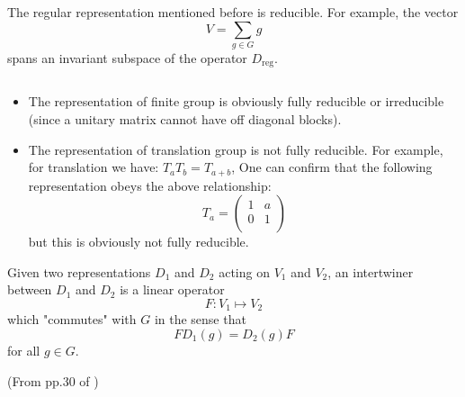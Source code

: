 \begin{ex}
    The regular representation mentioned before is reducible. For
    example, the vector
    \begin{equation}
        V = \sum_{g\in G} g
    \end{equation}
    spans an invariant subspace of the operator $D_\text{reg}$.
\end{ex}


\begin{ex}$ $

    \begin{itemize}
        \item The representation of finite group is obviously fully
            reducible or irreducible (since a unitary matrix cannot
            have off diagonal blocks).
        \item The representation of translation group is not fully
            reducible. For example, for translation we have:
            $T_a T_b = T_{a+b}$,
            One can confirm that the following representation obeys
            the above relationship:
            $$T_a = \left( \begin{array}{cc}
                 1 & a \\
                 0 & 1 \\
            \end{array} \right)$$
            but this is obviously not fully reducible.
    \end{itemize}
\end{ex}

\begin{defi}[Interwiner]
    Given two representations $D_1$ and $D_2$ acting on $V_1$ and
    $V_2$, an intertwiner between $D_1$ and $D_2$ is a linear operator
    \begin{equation}
        F: V_1 \mapsto V_2
    \end{equation}
    which "commutes" with $G$ in the sense that
    \begin{equation}
        F D_1(g) = D_2(g) F
    \end{equation}
    for all $g\in G$.
\end{defi}

(From pp.30 of \cite{Ludeling})

